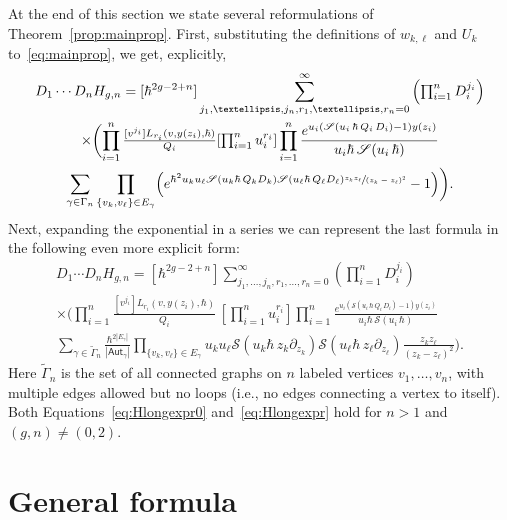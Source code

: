 \documentclass[11pt]{article}
\newcommand{\ie}{i.e.,\xspace}
\let\mathcal\mathscr
\theoremstyle{plain}
\theoremstyle{definition}
\theoremstyle{remark}
\newcommand{\cS}{\mathcal{S}}
\begin{document}
At the end of this section we state several reformulations of Theorem~\ref{prop:mainprop}. First, substituting the definitions of $w_{k,\ell}$ and $U_k$ to~\eqref{eq:mainprop}, we get, explicitly,
\begin{multline}\label{eq:Hlongexpr0}
D_1\cdots D_nH_{g,n}=[\hbar^{2g-2+n}]
\sum_{j_1,\dots,j_n,r_1,\dots,r_n=0}^\infty \left(\textstyle\prod_{i=1}^nD_i^{j_i}\right)\\
\times\biggl(
\prod_{i=1}^n
\tfrac{[v^{j_i}]L_{r_i}(v,y(z_i),\hbar)}{Q_i}[{\textstyle\prod_{i=1}^n u_i^{r_i}}]
\prod_{i=1}^n
\frac{e^{u_i(\cS(u_i\,\hbar\,Q_i\,D_i)-1)y(z_i)}}{u_i\hbar\,\cS(u_i\,\hbar)}\\
\sum_{\gamma \in \Gamma_n}\prod_{\{v_k,v_\ell\}\in E_\gamma}
\Bigl(e^{\hbar^2u_ku_\ell\cS(u_k\hbar\,Q_k D_k)\cS(u_\ell\hbar\,Q_\ell D_\ell)
\sfrac{z_k z_\ell}{(z_k-z_\ell)^2}}-1\Bigr)\biggr).
\end{multline}
Next, expanding the exponential in a series we can represent the last formula in the following even more explicit form:\vspace*{-5pt}\enlargethispage{.5\baselineskip}%
\begin{multline}\label{eq:Hlongexpr}
D_1\cdots D_nH_{g,n}=[\hbar^{2g-2+n}]
\sum_{j_1,\dots,j_n,r_1,\dots,r_n=0}^\infty \left(\textstyle\prod_{i=1}^nD_i^{j_i}\right)\\[-3pt]
\times\biggl(
\prod_{i=1}^n
\frac{[v^{j_i}]L_{r_i}(v,y(z_i),\hbar)}{Q_i}\, [{\textstyle\prod_{i=1}^n u_i^{r_i}}]
\prod_{i=1}^n
\frac{e^{u_i(\cS(u_i\,\hbar\,Q_i\,D_i)-1)y(z_i)}}{u_i\hbar\,\cS(u_i\,\hbar)}\\[-2pt]
\sum_{\gamma\in\widetilde{\Gamma}_n} \frac{\hbar^{2|E_\gamma|}}{|\mathsf{Aut}_\gamma|} \prod_{\{v_k,v_\ell\}\in E_\gamma} u_ku_\ell \cS(u_k\hbar\,z_k\partial_{z_k})\cS(u_\ell\hbar\,z_\ell\partial_{z_\ell})\frac{ z_kz_\ell}{(z_k-z_\ell)^2}\biggr).
\end{multline}
Here $\widetilde{\Gamma}_n$
is the set of all connected graphs
on $n$ labeled vertices $v_1,\ldots,v_n$, with multiple edges allowed but no loops
(\ie no edges connecting a vertex to itself). Both Equations~\eqref{eq:Hlongexpr0} and~\eqref{eq:Hlongexpr} hold for $n>1$ and $(g,n)\ne(0,2)$.

\section{General formula} \label{sec:MainTh}
\end{document}
